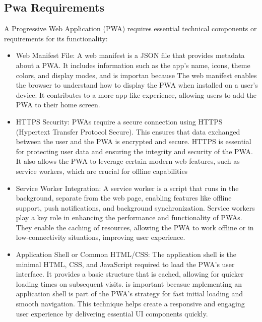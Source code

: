 \documentclass[12pt,a4paper, twosite]{article}
\begin{document}
  
\subsection{Pwa Requirements}
\label{sec:org24980a8}

A Progressive Web Application (PWA) requires essential technical components or requirements  for its functionality:
\begin{itemize}

\item  Web Manifest File: A web manifest is a JSON file that provides metadata about a PWA. It includes information such as the app's name, icons, theme colors, and display modes, and is importan because The web manifest enables the browser to understand how to display the PWA when installed on a user's device. It contributes to a more app-like experience, allowing users to add the PWA to their home screen.

\item HTTPS Security: PWAs require a secure connection using HTTPS (Hypertext Transfer Protocol Secure). This ensures that data exchanged between the user and the PWA is encrypted and secure. HTTPS is essential for protecting user data and ensuring the integrity and security of the PWA. It also allows the PWA to leverage certain modern web features, such as service workers, which are crucial for offline capabilities

\item Service Worker Integration: A service worker is a script that runs in the background, separate from the web page, enabling features like offline support, push notifications, and background synchronization. Service workers play a key role in enhancing the performance and functionality of PWAs. They enable the caching of resources, allowing the PWA to work offline or in low-connectivity situations, improving user experience.

\item Application Shell or Common HTML/CSS: The application shell is the minimal HTML, CSS, and JavaScript required to load the PWA's user interface. It provides a basic structure that is cached, allowing for quicker loading times on subsequent visits. is important becasue mplementing an application shell is part of the PWA's strategy for fast initial loading and smooth navigation. This technique helps create a responsive and engaging user experience by delivering essential UI components quickly.


\end{itemize}
\end{document}
